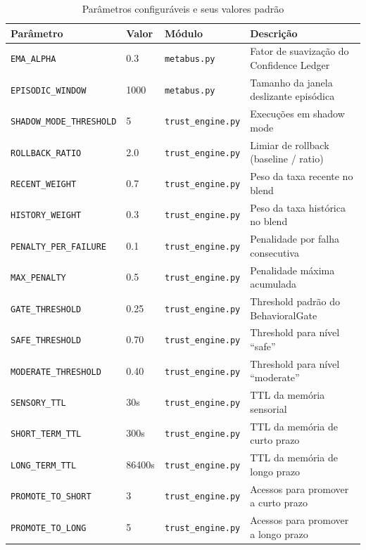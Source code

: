 \begin{table}[htbp]
\centering
\caption{Parâmetros configuráveis e seus valores padrão}
\label{tab:parameters}
\begin{tabular}{@{}p{4.5cm}p{2cm}p{2.5cm}p{4.5cm}@{}}
\toprule
\textbf{Parâmetro} & \textbf{Valor} & \textbf{Módulo} & \textbf{Descrição} \\
\midrule
\texttt{EMA\_ALPHA} & 0.3 & \texttt{metabus.py} & Fator de suavização do Confidence Ledger \\
\texttt{EPISODIC\_WINDOW} & 1000 & \texttt{metabus.py} & Tamanho da janela deslizante episódica \\
\texttt{SHADOW\_MODE\_THRESHOLD} & 5 & \texttt{trust\_engine.py} & Execuções em shadow mode \\
\texttt{ROLLBACK\_RATIO} & 2.0 & \texttt{trust\_engine.py} & Limiar de rollback (baseline / ratio) \\
\texttt{RECENT\_WEIGHT} & 0.7 & \texttt{trust\_engine.py} & Peso da taxa recente no blend \\
\texttt{HISTORY\_WEIGHT} & 0.3 & \texttt{trust\_engine.py} & Peso da taxa histórica no blend \\
\texttt{PENALTY\_PER\_FAILURE} & 0.1 & \texttt{trust\_engine.py} & Penalidade por falha consecutiva \\
\texttt{MAX\_PENALTY} & 0.5 & \texttt{trust\_engine.py} & Penalidade máxima acumulada \\
\texttt{GATE\_THRESHOLD} & 0.25 & \texttt{trust\_engine.py} & Threshold padrão do BehavioralGate \\
\texttt{SAFE\_THRESHOLD} & 0.70 & \texttt{trust\_engine.py} & Threshold para nível ``safe'' \\
\texttt{MODERATE\_THRESHOLD} & 0.40 & \texttt{trust\_engine.py} & Threshold para nível ``moderate'' \\
\texttt{SENSORY\_TTL} & 30s & \texttt{trust\_engine.py} & TTL da memória sensorial \\
\texttt{SHORT\_TERM\_TTL} & 300s & \texttt{trust\_engine.py} & TTL da memória de curto prazo \\
\texttt{LONG\_TERM\_TTL} & 86400s & \texttt{trust\_engine.py} & TTL da memória de longo prazo \\
\texttt{PROMOTE\_TO\_SHORT} & 3 & \texttt{trust\_engine.py} & Acessos para promover a curto prazo \\
\texttt{PROMOTE\_TO\_LONG} & 5 & \texttt{trust\_engine.py} & Acessos para promover a longo prazo \\
\bottomrule
\end{tabular}
\end{table}

